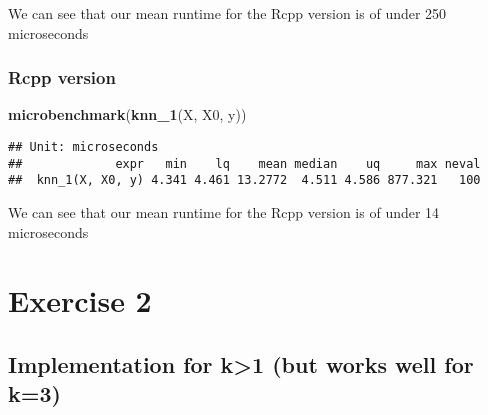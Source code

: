 \documentclass[]{article}
\newenvironment{Shaded}{\begin{snugshade}}{\end{snugshade}}
\newcommand{\KeywordTok}[1]{\textcolor[rgb]{0.13,0.29,0.53}{\textbf{#1}}}
\newcommand{\NormalTok}[1]{#1}
\begin{document}
We can see that our mean runtime for the Rcpp version is of under 250
microseconds

\hypertarget{rcpp-version}{%
\subsubsection{Rcpp version}\label{rcpp-version}}

\begin{Shaded}
\begin{Highlighting}[]
\KeywordTok{microbenchmark}\NormalTok{(}\KeywordTok{knn_1}\NormalTok{(X, X0, y))}
\end{Highlighting}
\end{Shaded}

\begin{verbatim}
## Unit: microseconds
##             expr   min    lq    mean median    uq     max neval
##  knn_1(X, X0, y) 4.341 4.461 13.2772  4.511 4.586 877.321   100
\end{verbatim}

We can see that our mean runtime for the Rcpp version is of under 14
microseconds

\newpage

\hypertarget{exercise-2}{%
\section{Exercise 2}\label{exercise-2}}

\hypertarget{implementation-for-k1-but-works-well-for-k3}{%
\subsection{Implementation for k\textgreater{}1 (but works well for
k=3)}\label{implementation-for-k1-but-works-well-for-k3}}
\end{document}
